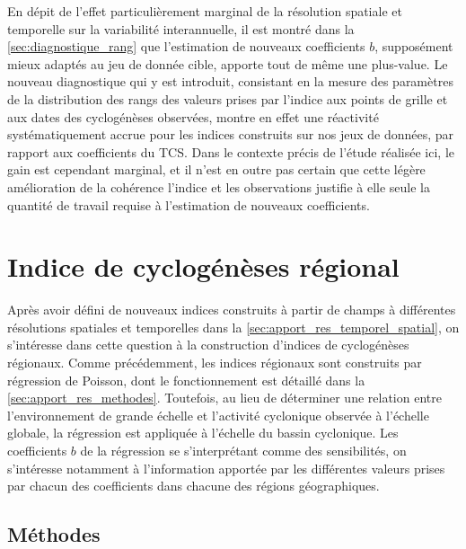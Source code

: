 \documentclass[../main.tex]{subfiles}
\begin{document}
En dépit de l'effet particulièrement marginal de la résolution spatiale et temporelle sur la variabilité interannuelle, il est montré dans la
\cref{sec:diagnostique_rang} que l'estimation de nouveaux coefficients $b$, supposément mieux adaptés au jeu de donnée cible, apporte tout de même une
plus-value. Le nouveau diagnostique qui y est introduit, consistant en la mesure des paramètres de la distribution des rangs des valeurs prises par l'indice aux
points de grille et aux dates des cyclogénèses observées, montre en effet une réactivité systématiquement accrue pour les indices construits sur nos jeux de
données, par rapport aux coefficients du TCS. Dans le contexte précis de l'étude réalisée ici, le gain est cependant marginal, et il n'est en outre pas certain
que cette légère amélioration de la cohérence l'indice et les observations justifie à elle seule la quantité de travail requise à l'estimation de nouveaux
coefficients.

\section{Indice de cyclogénèses régional}

Après avoir défini de nouveaux indices construits à partir de champs à différentes résolutions spatiales et temporelles dans la
\cref{sec:apport_res_temporel_spatial}, on s'intéresse dans cette question à la construction d'indices de cyclogénèses régionaux. Comme précédemment, les
indices régionaux sont construits par régression de Poisson, dont le fonctionnement est détaillé dans la \cref{sec:apport_res_methodes}. Toutefois, au lieu de
déterminer une relation entre l'environnement de grande échelle et l'activité cyclonique observée à l'échelle globale, la régression est appliquée à l'échelle
du bassin cyclonique. Les coefficients $b$ de la régression se s'interprétant comme des sensibilités, on s'intéresse notamment à l'information apportée par les
différentes valeurs prises par chacun des coefficients dans chacune des régions géographiques.

\subsection{Méthodes}
\end{document}
